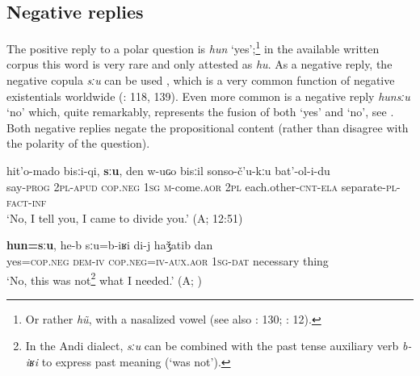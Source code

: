 \documentclass[output=paper,colorlinks=true, citecolor=brown]{langscibook}
\begin{document}
\subsection{Negative replies} \label{sec:and:3.1}

The positive reply to a polar question is \textit{hun} ‘yes’;\footnote{Or rather \textrm{\textit{h\~u}}, with a nasalized vowel (see also \citealt{Dirr1906}: 130; \citealt{Salimov2010}: 12).} in the available written corpus this word is very rare and only attested as \textit{hu}. As a negative reply, the negative copula \textit{sːu} can be used , which is a very common function of negative existentials worldwide (\citealt{Veselinova2013neg.exist}: 118, 139). Even more common is a negative reply \textit{hunsːu} ‘no’ which, quite remarkably, represents the fusion of both ‘yes’ and ‘no’, see . Both negative replies negate the propositional content (rather than disagree with the polarity of the question).

\ea\label{ex:and:46}
    \begin{xlist}
    \label{ex:and:46A}
    \label{ex:and:46B}
        \gll  hit’o{}-mado bisːi{}-qi, \textbf{sːu}, den w{}-uɢo bisːil sonso{}-č’u{}-kːu bat’{}-ol{}-i{}-du\\ 
               say-\textsc{prog} \textsc{2pl{}-apud} \textsc{cop.neg} \textsc{1sg} \textsc{m}{}-come.\textsc{aor} \textsc{2pl} each.other-\textsc{cnt-ela} separate{}-\textsc{pl}{}-\textsc{fact{}-inf}\\
        \glt ‘No, I tell you, I came to divide you.’ (A;  12:51)
    \end{xlist}
\z 

\newpage
\ea\label{ex:and:47}
    \begin{xlist}
    \label{ex:and:47A}
    \label{ex:and:47B}
        \gll  \textbf{hun=sːu}, he{}-b sːu=b{}-iʁi di{}-j haǯatib dan\\ 
               yes=\textsc{cop.neg} \textsc{dem-iv} \textsc{cop.neg=iv-aux.aor} \textsc{1sg}-\textsc{dat} necessary thing\\
        \glt ‘No, this was not\footnote{In the Andi dialect, \textrm{\textit{sːu}} can be combined with the past tense auxiliary verb \textrm{\textit{b\nobreakdash-iʁi}} to express past meaning (‘was not’).} what I needed.’ (A; )
    \end{xlist}
\z 
\end{document}
